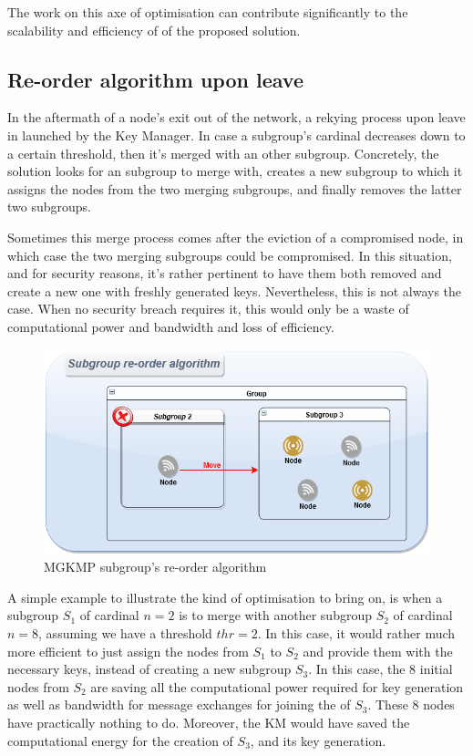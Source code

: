 The work on this axe of optimisation can contribute significantly to the scalability and efficiency of of the proposed solution.

\subsection{Re-order algorithm upon leave}
\label{subsec:re-order}

In the aftermath of a node’s exit out of the network, a rekying process upon leave in launched by the Key Manager. In case a subgroup’s cardinal decreases down to a certain threshold, then it’s merged with an other subgroup. Concretely, the solution looks for an subgroup to merge with, creates a new subgroup to which it assigns the nodes from the two merging subgroups, and finally removes the latter two subgroups.

Sometimes this merge process comes after the eviction of a compromised node, in which case the two merging subgroups could be compromised. In this situation, and for security reasons, it’s rather pertinent to have them both removed and create a new one with freshly generated keys. Nevertheless, this is not always the case. When no security breach requires it, this would only be a waste of computational power and bandwidth and loss of efficiency.

\begin{figure}[htbp]
	\centerline{\includegraphics[scale=0.60]{figures/mgkmp/reorder.png}}
	\caption{MGKMP subgroup's re-order algorithm}
	\label{fig:re-order}
\end{figure}

A simple example to illustrate the kind of optimisation to bring on, is when a subgroup $S_1$ of cardinal $n=2$ is to merge with another subgroup $S_2$ of cardinal $n=8$, assuming we have a threshold $thr=2$. In this case, it would rather much more efficient to just assign the nodes from $S_1$ to $S_2$ and provide them with the necessary keys, instead of creating a new subgroup $S_3$. In this case, the 8 initial nodes from $S_2$ are saving all the computational power required for key generation as well as bandwidth for message exchanges for joining the of $S_3$. These 8 nodes have practically nothing to do. Moreover, the KM would have saved the computational energy for the creation of $S_3$, and its key generation.


